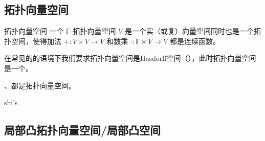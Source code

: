 
\subsection{拓扑向量空间}

\begin{definition}{拓扑向量空间}
一个 $\mathbb{F}$-拓扑向量空间 $V$ 是一个实（或复）向量空间同时也是一个拓扑空间，使得加法 $+: V \times V \to V$ 和数乘 $\cdot: \mathbb{F} \times V \to V$ 都是连续函数。

在常见的的语境下我们要求拓扑向量空间是Hasdorff空间（），此时拓扑向量空间是一个。
\end{definition}

\begin{example}{}
、都是拓扑向量空间。

shi's
\end{example}


\subsection{局部凸拓扑向量空间/局部凸空间}





